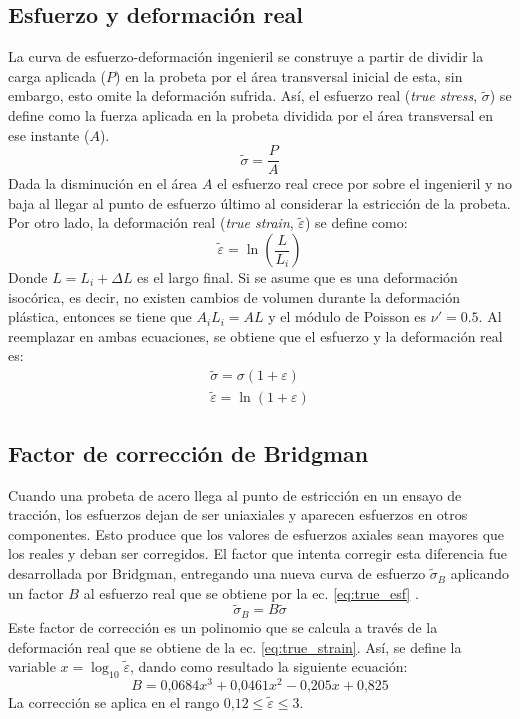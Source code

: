 \subsection{Esfuerzo y deformación real}
La curva de esfuerzo-deformación ingenieril se construye a partir de dividir la carga aplicada ($P$) en la probeta por el área transversal inicial de esta, sin embargo, esto omite la deformación sufrida. Así, el esfuerzo real (\textit{true stress}, $\tilde{\sigma}$) se define como la fuerza aplicada en la probeta dividida por el área transversal en ese instante ($A$). 
\begin{equation}
	\tilde{\sigma} = \frac{P}{A}
\end{equation} 
Dada la disminución en el área $A$ el esfuerzo real crece por sobre el ingenieril y no baja al llegar al punto de esfuerzo último al considerar la estricción de la probeta. Por otro lado, la deformación real (\textit{true strain}, $\tilde{\varepsilon}$) se define como:
\begin{equation}
	\tilde{\varepsilon} = \ln\left(\frac{L}{L_i}\right)
\end{equation}
Donde $L=L_i + \Delta L$ es el largo final. Si se asume que es una deformación isocórica, es decir, no existen cambios de volumen durante la deformación plástica, entonces se tiene que $A_iL_i = AL$ y el módulo de Poisson es $\nu' = 0.5$. Al reemplazar en ambas ecuaciones, se obtiene que el esfuerzo y la deformación real es:
\begin{gather}
	\tilde{\sigma} = \sigma(1 + \varepsilon) \label{eq:true_esf}\\
	\tilde{\varepsilon} = \ln (1 + \varepsilon) \label{eq:true_strain}
\end{gather}

\subsection{Factor de corrección de Bridgman}
Cuando una probeta de acero llega al punto de estricción en un ensayo de tracción, los esfuerzos dejan de ser uniaxiales y aparecen esfuerzos en otros componentes. Esto produce que los valores de esfuerzos axiales sean mayores que los reales y deban ser corregidos. El factor que intenta corregir esta diferencia fue desarrollada por Bridgman, entregando una nueva curva de esfuerzo $\tilde{\sigma}_B$ aplicando un factor $B$ al esfuerzo real que se obtiene por la ec. \ref{eq:true_esf} \cite{dowling2013mechanical}.
\begin{equation}
	\tilde{\sigma}_B = B\tilde{\sigma}
\end{equation}
Este factor de corrección es un polinomio que se calcula a través de la deformación real que se obtiene de la ec. \ref{eq:true_strain}. Así, se define la variable $x = \log_{10} \tilde{\varepsilon}$, dando como resultado la siguiente ecuación:
\begin{equation}\label{eq:bridgman}
B = 0\text{,}0684x^3 + 0\text{,}0461x^2 - 0\text{,}205x + 0\text{,}825 
\end{equation}
La corrección se aplica en el rango $0\text{,}12 \leq \tilde{\varepsilon} \leq 3$.

